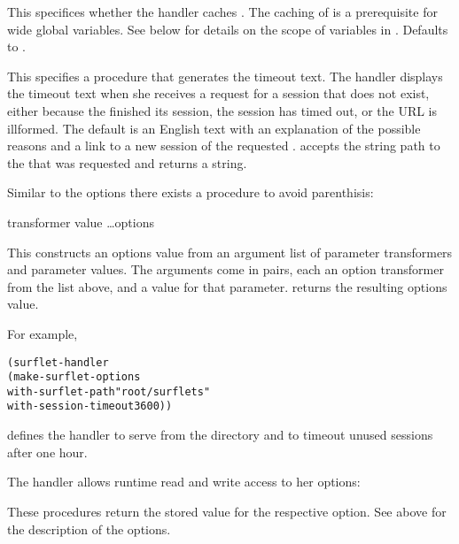 \begin{desc}
  This specifices whether the \surflet handler caches \surflets.  The
  caching of \surflets is a prerequisite for \surflet wide global
  variables.  See below for details on the scope of variables in
  \surflets.  Defaults to \sharpt.
\end{desc}

\begin{desc}
  This specifies a procedure that generates the timeout text.  The
  \surflet handler displays the timeout text when she receives a
  request for a \surflet session that does not exist, either because
  the \surflet finished its session, the session has timed out, or the
  URL is illformed.  The default is an English text with an
  explanation of the possible reasons and a link to a new session of
  the requested \surflet.   accepts the
  string path to the \surflet that was requested and returns a string.
\end{desc}

Similar to the  options there exists a procedure to avoid
parenthisis:

 {transformer value \ldots}{options}
\begin{desc}
  This constructs an options value from an argument list of parameter
  transformers and parameter values.  The arguments come in pairs,
  each an option transformer from the list above, and a value for that
  parameter.  returns the resulting options
  value.
\end{desc}

For example,

\begin{alltt}
(surflet-handler 
  (make-surflet-options
   with-surflet-path "root/surflets"
   with-session-timeout 3600))
\end{alltt}

defines the \surflet handler to serve \surflets from the directory
 and to timeout unused sessions after one hour.

The \surflet handler allows runtime read and write access to her
options:

\begin{desc}
  These procedures return the stored value for the respective option.
  See above for the description of the options.
\end{desc}

